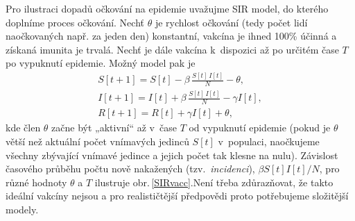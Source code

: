 Pro ilustraci dopadů očkování na epidemie uvažujme SIR model, do kterého doplníme proces očkování. Nechť $\theta$ je rychlost očkování (tedy počet lidí naočkovaných např. za jeden den) konstantní, vakcína je ihned 100\% účinná a získaná imunita je trvalá. Nechť je dále vakcína k~dispozici až po určitém čase $T$ po vypuknutí epidemie. Možný model pak je
\begin{equation}
\begin{array}{l}
\displaystyle{S[t+1] = S[t] - \beta \, \frac{S[t]\,I[t]}{N} - \theta}, \\[3ex]
\displaystyle{I[t+1] = I[t] + \beta \, \frac{S[t]\,I[t]}{N} - \gamma I[t]}, \\[3ex]
\displaystyle{R[t+1] = R[t] + \gamma I[t] + \theta},
\end{array}
\label{modSIRV}
\end{equation}
kde člen $\theta$ začne být „aktivní“ až v~čase $T$ od vypuknutí epidemie (pokud je $\theta$ větší než aktuální počet vnímavých jedinců $S[t]$ v~populaci, naočkujeme všechny zbývající vnímavé jedince a jejich počet tak klesne na nulu). Závislost časového průběhu počtu nově nakažených (tzv.\ \emph{incidenci}), $\beta S[t] I[t]/N$, pro různé hodnoty $\theta$ a $T$ ilustruje obr.\,\ref{SIRvacc}.Není třeba zdůrazňovat, že takto ideální vakcíny nejsou a pro realističtější předpovědi proto potřebujeme složitější modely.


